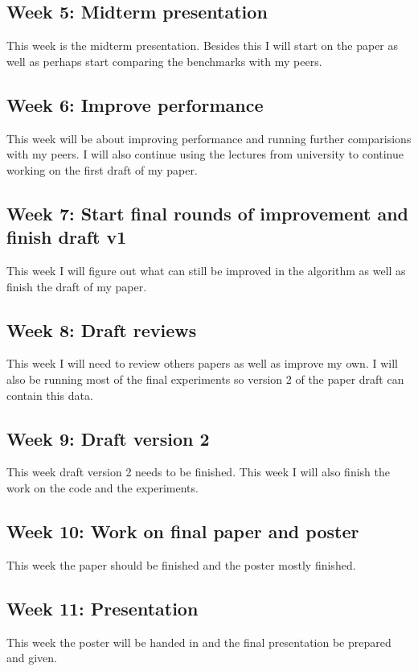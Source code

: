 \documentclass[english]{article}
\begin{document}
\subsection*{Week 5: Midterm presentation}
This week is the midterm presentation. Besides this I will start on the paper as well as perhaps start comparing the benchmarks with my peers.

\subsection*{Week 6: Improve performance}
This week will be about improving performance and running further comparisions with my peers. I will also continue using the lectures from university to continue working on the first draft of my paper.

\subsection*{Week 7: Start final rounds of improvement and finish draft v1}
This week I will figure out what can still be improved in the algorithm as well as finish the draft of my paper.

\subsection*{Week 8: Draft reviews}
This week I will need to review others papers as well as improve my own. I will also be running most of the final experiments so version 2 of the paper draft can contain this data.

\subsection*{Week 9: Draft version 2}
This week draft version 2 needs to be finished. This week I will also finish the work on the code and the experiments.

\subsection*{Week 10: Work on final paper and poster}
This week the paper should be finished and the poster mostly finished.

\subsection*{Week 11: Presentation}
This week the poster will be handed in and the final presentation be prepared and given.
\end{document}
